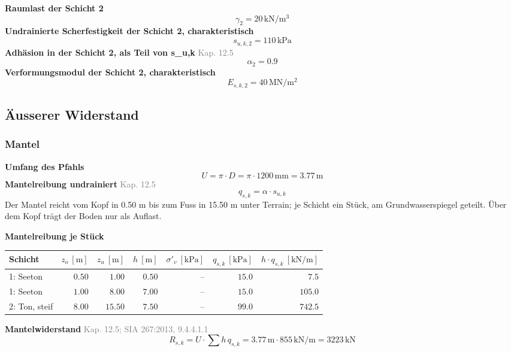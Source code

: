 \documentclass[11pt,a4paper]{article}
\newcommand{\normref}[1]{{\small\textcolor{gray}{#1}}}
\begin{document}
\noindent\textbf{Raumlast der Schicht 2}
\begin{equation*}
\gamma_{2} = 20\,\mathrm{kN}/\mathrm{m}^{3}
\end{equation*}
\noindent\textbf{Undrainierte Scherfestigkeit der Schicht 2, charakteristisch}
\begin{equation*}
s_{u,k,2} = 110\,\mathrm{kPa}
\end{equation*}
\noindent\textbf{Adhäsion in der Schicht 2, als Teil von s\_u,k} \hfill \normref{Kap. 12.5}
\begin{equation*}
\alpha_{2} = 0.9
\end{equation*}
\noindent\textbf{Verformungsmodul der Schicht 2, charakteristisch}
\begin{equation*}
E_{s,k,2} = 40\,\mathrm{MN}/\mathrm{m}^{2}
\end{equation*}
\subsection{Äusserer Widerstand}
\subsubsection{Mantel}
\noindent\textbf{Umfang des Pfahls}
\begin{equation*}
U = \pi \cdot D = \pi \cdot 1200\,\mathrm{mm} = 3.77\,\mathrm{m}
\end{equation*}
\noindent\textbf{Mantelreibung undrainiert} \hfill \normref{Kap. 12.5}
\begin{equation*}
q_{s,k} = \alpha \cdot s_{u,k}
\end{equation*}
Der Mantel reicht vom Kopf in 0.50 m bis zum Fuss in 15.50 m unter Terrain; je Schicht ein Stück, am Grundwasserspiegel geteilt. Über dem Kopf trägt der Boden nur als Auflast.

\noindent\textbf{Mantelreibung je Stück}
\begin{longtable}{lrrrrrr}
\hline
Schicht & $z_o\ [\mathrm{m}]$ & $z_u\ [\mathrm{m}]$ & $h\ [\mathrm{m}]$ & $\sigma'_v\ [\mathrm{kPa}]$ & $q_{s,k}\ [\mathrm{kPa}]$ & $h \cdot q_{s,k}\ [\mathrm{kN/m}]$ \\
\hline
\endhead
1: Seeton & $0.50$ & $1.00$ & $0.50$ & – & $15.0$ & $7.5$ \\
1: Seeton & $1.00$ & $8.00$ & $7.00$ & – & $15.0$ & $105.0$ \\
2: Ton, steif & $8.00$ & $15.50$ & $7.50$ & – & $99.0$ & $742.5$ \\
\hline
\end{longtable}
\noindent\textbf{Mantelwiderstand} \hfill \normref{Kap. 12.5; SIA 267:2013, 9.4.4.1.1}
\begin{equation*}
R_{s,k} = U \cdot \sum h \, q_{s,k} = 3.77\,\mathrm{m} \cdot 855\,\mathrm{kN}/\mathrm{m} = 3223\,\mathrm{kN}
\end{equation*}
\end{document}
